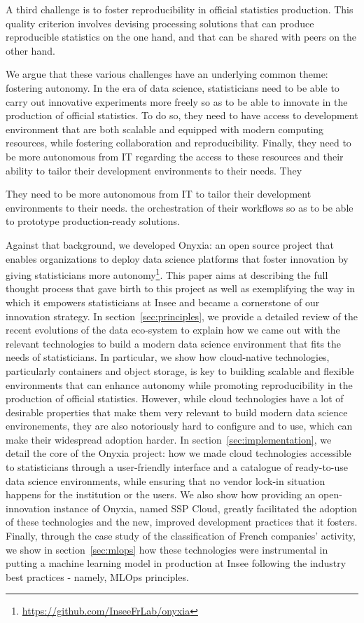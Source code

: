 A third challenge is to foster reproducibility in official statistics production. This quality criterion involves devising processing solutions that can produce reproducible statistics on the one hand, and that can be shared with peers on the other hand.

We argue that these various challenges have an underlying common theme: fostering autonomy. In the era of data science, statisticians need to be able to carry out innovative experiments more freely so as to be able to innovate in the production of official statistics. To do so, they need to have access to development environment that are both scalable and equipped with modern computing resources, while fostering collaboration and reproducibility. Finally, they need to be more autonomous from IT regarding the access to these resources and their ability to tailor their development environments to their needs. They 

They need to be more autonomous from IT to tailor their development environments to their needs. the orchestration of their workflows so as to be able to prototype production-ready solutions.

Against that background, we developed Onyxia: an open source project that enables organizations to deploy data science platforms that foster innovation by giving statisticians more autonomy\footnote{\url{https://github.com/InseeFrLab/onyxia}}. This paper aims at describing the full thought process that gave birth to this project as well as exemplifying the way in which it empowers statisticians at Insee and became a cornerstone of our innovation strategy. In section~\ref{sec:principles}, we provide a detailed review of the recent evolutions of the data eco-system to explain how we came out with the relevant technologies to build a modern data science environment that fits the needs of statisticians. In particular, we show how cloud-native technologies, particularly containers and object storage, is key to building scalable and flexible environments that can enhance autonomy while promoting reproducibility in the production of official statistics. However, while cloud technologies have a lot of desirable properties that make them very relevant to build modern data science environements, they are also notoriously hard to configure and to use, which can make their widespread adoption harder. In section~\ref{sec:implementation}, we detail the core of the Onyxia project: how we made cloud technologies accessible to statisticians through a user-friendly interface and a catalogue of ready-to-use data science environments, while ensuring that no vendor lock-in situation happens for the institution or the users. We also show how providing an open-innovation instance of Onyxia, named SSP Cloud, greatly facilitated the adoption of these technologies and the new, improved development practices that it fosters. Finally, through the case study of the classification of French companies' activity, we show in section~\ref{sec:mlops} how these technologies were instrumental in putting a machine learning model in production at Insee following the industry best practices - namely, MLOps principles.



